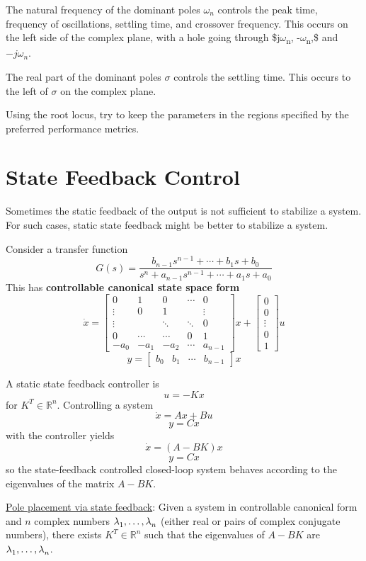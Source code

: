 \documentclass[11pt]{article}
\begin{document}
The natural frequency of the dominant poles \(\omega_{n}\) controls the peak time, frequency of
oscillations, settling time, and crossover frequency.
This occurs on the left side of the complex plane, with a hole going through \$j\(\omega\)\textsubscript{n}, -\(\omega\)\textsubscript{n},\$
and \(-j\omega_{n}\).

The real part of the dominant poles \(\sigma\) controls the settling time.
This occurs to the left of \(\sigma\) on the complex plane.

Using the root locus, try to keep the parameters in the regions specified by the preferred
performance metrics.
\section{State Feedback Control}
\label{sec:org3d0a16f}
Sometimes the static feedback of the output is not sufficient to stabilize a system.
For such cases, static state feedback might be better to stabilize a system.

Consider a transfer function
$$ G(s) = \frac{b_{n-1}s^{n-1} + \cdots + b_{1}s + b_{0}}{s^{n} + a_{n-1}s^{n-1} + \cdots + a_{1} s + a_{0}} $$
This has \textbf{controllable canonical state space form}
$$ \dot{x} = \begin{bmatrix} 0 & 1 & 0 & \cdots & 0 \\ \vdots & 0 & 1 & & \vdots \\ \vdots & & \ddots & \ddots & 0 \\ 0 & \cdots & \cdots & 0 & 1 \\ -a_{0} & -a_{1} & -a_{2} & \cdots & a_{n-1} \end{bmatrix}x + \begin{bmatrix} 0 \\ 0 \\ \vdots \\ 0 \\ 1 \end{bmatrix} u $$
$$ y = \begin{bmatrix} b_{0} & b_{1} & \cdots & b_{n-1} \end{bmatrix} x $$

A static state feedback controller is
$$ u = -Kx $$
for \(K^{T} \in \mathbb{R}^{n}\).
Controlling a system
$$ \dot{x} = Ax + Bu $$
$$y = Cx $$
with the controller yields
$$ \dot{x} = (A - BK) x $$
$$y = Cx $$
so the state-feedback controlled closed-loop system behaves according to the eigenvalues of
the matrix \(A - BK\).

\uline{Pole placement via state feedback}: Given a system in controllable canonical form and \(n\) complex
numbers \(\lambda^{\*}_{1}, \dots, \lambda^{\*}_{n}\) (either real or pairs of complex conjugate
numbers), there exists \(K^{T} \in \mathbb{R}^{n}\) such that the eigenvalues of \(A - BK\) are
\(\lambda^{\*}_{1}, \dots, \lambda_{n}^{\*}\).
\end{document}
